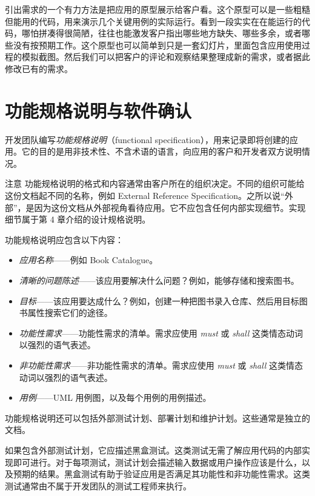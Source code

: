 引出需求的一个有力方法是把应用的原型展示给客户看。这个原型可以是一些粗糙但能用的代码，用来演示几个关键用例的实际运行。看到一段实实在在能运行的代码，哪怕拼凑得很简陋，往往也能激发客户指出哪些地方缺失、哪些多余，或者哪些没有按预期工作。这个原型也可以简单到只是一套幻灯片，里面包含应用使用过程的模拟截图。然后我们可以把客户的评论和观察结果整理成新的需求，或者据此修改已有的需求。

\section{功能规格说明与软件确认}

开发团队编写\emph{功能规格说明}（functional specification），用来记录即将创建的应用。它的目的是用非技术性、不含术语的语言，向应用的客户和开发者双方说明情况。

\begin{myWarning}{注意}
功能规格说明的格式和内容通常由客户所在的组织决定。不同的组织可能给这份文档起不同的名称，例如 External Reference Specification。之所以说“外部”，是因为这份文档从外部视角看待应用。它不应包含任何内部实现细节。实现细节属于第 4 章介绍的设计规格说明。
\end{myWarning}

功能规格说明应包含以下内容：

\begin{itemize}
\item \emph{应用名称}——例如 Book Catalogue。
\item \emph{清晰的问题陈述}——该应用要解决什么问题？例如，能够存储和搜索图书。
\item \emph{目标}——该应用要达成什么？例如，创建一种把图书录入仓库、然后用目标图书属性搜索它们的途径。
\item \emph{功能性需求}——功能性需求的清单。需求应使用 \emph{must} 或 \emph{shall} 这类情态动词以强烈的语气表述。
\item \emph{非功能性需求}——非功能性需求的清单。需求应使用 \emph{must} 或 \emph{shall} 这类情态动词以强烈的语气表述。
\item \emph{用例}——UML 用例图，以及每个用例的用例描述。
\end{itemize}

功能规格说明还可以包括外部测试计划、部署计划和维护计划。这些通常是独立的文档。

如果包含外部测试计划，它应描述黑盒测试。这类测试无需了解应用代码的内部实现即可进行。对于每项测试，测试计划会描述输入数据或用户操作应该是什么，以及预期的结果。黑盒测试有助于验证应用是否满足其功能性和非功能性需求。这类测试通常由不属于开发团队的测试工程师来执行。

